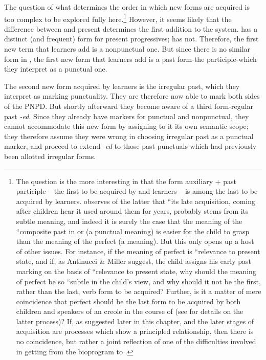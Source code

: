 The question of what determines the order in which new forms are acquired is too complex to be explored fully here.\footnote{The question is the more interesting in that the form auxiliary + past participle -- the first to be acquired by  and  learners -- is among the last to be acquired by  learners. \citet{Maratsos1979} observes of the latter that ``its late acquisition, coming after children hear it used around them for years, probably stems from its subtle meaning, and indeed it is surely the case that the meaning of the ``composite past in  or  (a punctual meaning) is easier for the child to grasp than the meaning of the  perfect (a  meaning). But this only opens up a host of other issues. For instance, if the meaning of  perfect is ``relevance to present state, and if, as Antinucci \& Miller suggest, the child assigns his early past marking on the basis of ``relevance to present state, why should the meaning of perfect be so ``subtle in the child's view, and why should it not be the first, rather than the last, verb form to be acquired? Further, is it a matter of mere coincidence that perfect should be the last form to be acquired by both children   and speakers of an  creole in the course of  (see \citet[126ff.]{Bickerton1975} for details on the latter process)? If, as suggested later in this chapter,  and the later stages of acquisition are processes which show a principled relationship, then there is no coincidence, but rather a joint reflection of one of the difficulties involved in getting from the bioprogram to .} However, it seems likely that the difference between  and  present  determines the first addition to the system.  has a dis\-tinct (and frequent) form for present progressives;  has not. Therefore, the first new term that  learners add is a nonpunctual one. But since there is no similar form in , the first new form that  learners add is a past form-the participle-which they interpret as a punctual one.

The second new form acquired by  learners is the irregular past, which they interpret as marking punctuality. They are therefore now able to mark both sides of the PNPD. But shortly afterward they become aware of a third form-regular past \textit{-ed}. Since they already have markers for punctual and nonpunctual, they cannot accommodate this new form by assigning to it its own semantic scope; they therefore assume they were wrong in choosing irregular past as a punctual marker, and proceed to extend \textit{-ed} to those past punctuals which had previously been allotted irregular forms.

